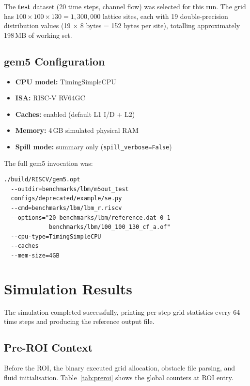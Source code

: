 \documentclass[conference]{IEEEtran}
\begin{document}
The \textbf{test} dataset (20 time steps, channel flow) was selected
for this run. The grid has $100 \times 100 \times 130 = 1{,}300{,}000$
lattice sites, each with 19 double-precision distribution values
(19 $\times$ 8 bytes = 152 bytes per site), totalling approximately
198\,MB of working set.

\subsection{gem5 Configuration}

\begin{itemize}
    \item \textbf{CPU model:}   TimingSimpleCPU
    \item \textbf{ISA:}         RISC-V RV64GC
    \item \textbf{Caches:}      enabled (default L1 I/D + L2)
    \item \textbf{Memory:}      4\,GB simulated physical RAM
    \item \textbf{Spill mode:}  summary only (\texttt{spill\_verbose=False})
\end{itemize}

The full gem5 invocation was:

\begin{verbatim}
./build/RISCV/gem5.opt
  --outdir=benchmarks/lbm/m5out_test
  configs/deprecated/example/se.py
  --cmd=benchmarks/lbm/lbm_r.riscv
  --options="20 benchmarks/lbm/reference.dat 0 1
             benchmarks/lbm/100_100_130_cf_a.of"
  --cpu-type=TimingSimpleCPU
  --caches
  --mem-size=4GB
\end{verbatim}

\section{Simulation Results}

The simulation completed successfully, printing per-step grid
statistics every 64 time steps and producing the reference output file.

\subsection{Pre-ROI Context}

Before the ROI, the binary executed grid allocation, obstacle file
parsing, and fluid initialisation. Table~\ref{tab:preroi} shows
the global counters at ROI entry.
\end{document}

